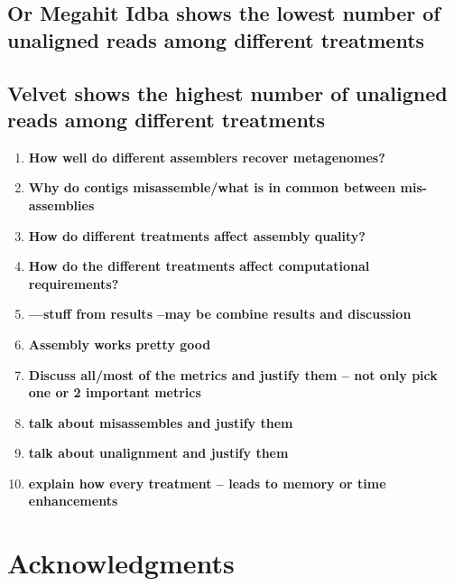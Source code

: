  \subsection*{Or Megahit Idba shows the lowest number of unaligned reads among different treatments}  
  
 \subsection*{Velvet shows the highest number of unaligned reads among different treatments} 


\begin{enumerate}

 \item {\bf  How well do different assemblers recover metagenomes?}
 \item {\bf  Why do contigs misassemble/what is in common between mis-assemblies}
 \item {\bf How do different treatments affect assembly quality?}
 \item {\bf  How do the different treatments affect computational requirements?}
 
  \item {\bf ---stuff from results --may be combine results and discussion}  
 \item {\bf Assembly works pretty good} 
  \item {\bf Discuss all/most of the metrics and justify them -- not only pick one or 2 important metrics} 
 \item{\bf talk about misassembles and justify them}  
  \item{\bf talk about  unalignment and justify them}  
 \item{\bf explain how every treatment -- leads to memory or time enhancements }
 
  
 \end{enumerate} 
 
 
  

\section*{Acknowledgments}


